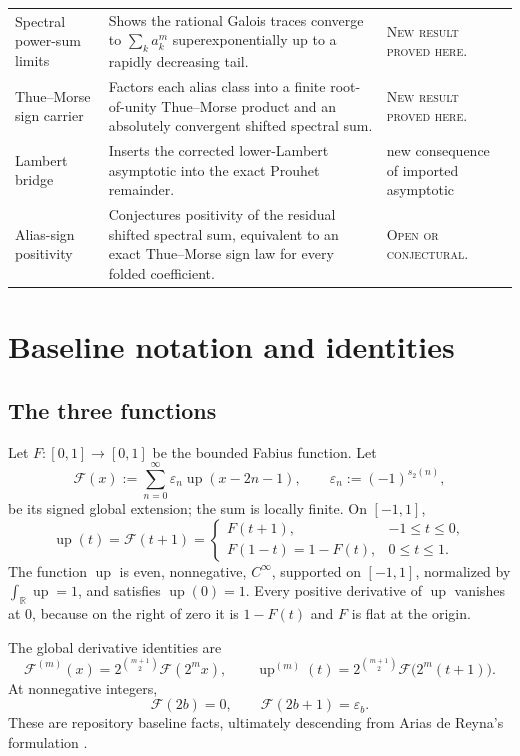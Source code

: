 \documentclass[11pt,oneside]{article}
\theoremstyle{definition}
\theoremstyle{remark}
\newcommand{\R}{\mathbb R}
\newcommand{\Up}{\operatorname{up}}
\newcommand{\eps}{\varepsilon}
\newcommand{\GF}{\mathcal F}
\newcommand{\newresult}{\textcolor{newgreen}{\textsc{New result proved here.}}}
\newcommand{\openstatus}{\textcolor{conjectureorange}{\textsc{Open or conjectural.}}}
\begin{document}
{\begin{longtable}{@{}>{\raggedright\arraybackslash}p{}>{\raggedright\arraybackslash}p{}>{\raggedright\arraybackslash}p{}@{}}
Spectral power-sum limits & Shows the rational Galois traces converge to $\sum_k a_k^m$ superexponentially up to a rapidly decreasing tail. & \newresult \\
Thue--Morse sign carrier & Factors each alias class into a finite root-of-unity Thue--Morse product and an absolutely convergent shifted spectral sum. & \newresult \\
Lambert bridge & Inserts the corrected lower-Lambert asymptotic into the exact Prouhet remainder. & new consequence of imported asymptotic \\
Alias-sign positivity & Conjectures positivity of the residual shifted spectral sum, equivalent to an exact Thue--Morse sign law for every folded coefficient. & \openstatus \\
\end{longtable}
}

\section{Baseline notation and identities}\label{p1:sec:baseline}

\subsection{The three functions}

Let $F:[0,1]\to[0,1]$ be the bounded Fabius function.  Let
\begin{equation}\label{p1:eq:global-F}
 \GF(x):=\sum_{n=0}^{\infty}\eps_n\Up(x-2n-1),
 \qquad \eps_n:=(-1)^{s_2(n)},
\end{equation}
be its signed global extension; the sum is locally finite.  On $[-1,1]$,
\begin{equation}\label{p1:eq:Up-F-relations}
 \Up(t)=\GF(t+1)=
 \begin{cases}
  F(t+1),&-1\le t\le0,\\
  F(1-t)=1-F(t),&0\le t\le1.
 \end{cases}
\end{equation}
The function $\Up$ is even, nonnegative, $C^\infty$, supported on $[-1,1]$,
normalized by $\int_{\R}\Up=1$, and satisfies $\Up(0)=1$.
Every positive derivative of $\Up$ vanishes at $0$, because on the right of
zero it is $1-F(t)$ and $F$ is flat at the origin.

The global derivative identities are
\begin{equation}\label{p1:eq:global-derivatives}
 \GF^{(m)}(x)=2^{\binom{m+1}{2}}\GF(2^m x),
 \qquad
 \Up^{(m)}(t)=2^{\binom{m+1}{2}}\GF\bigl(2^m(t+1)\bigr).
\end{equation}
At nonnegative integers,
\begin{equation}\label{p1:eq:global-integers}
 \GF(2b)=0,
 \qquad
 \GF(2b+1)=\eps_b.
\end{equation}
These are repository baseline facts, ultimately descending from Arias de Reyna's
formulation \cite{p1:ariascompact,p1:ariasarith}.
\end{document}
